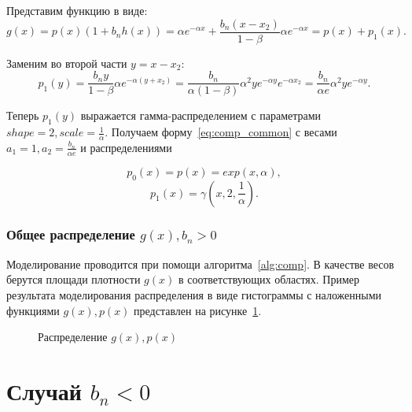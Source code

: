 \documentclass[12pt, specialist, subf, substylefile = spbu.rtx]{disser}
\begin{document}
Представим функцию в виде:
$$
g(x)=p(x)(1+b_nh(x))=\alpha e^{-\alpha x} + \frac{b_n(x-x_2)}{1-\beta}\alpha e^{-\alpha x}=p(x)+p_1(x).
$$

Заменим во второй части $y=x-x_2$:
$$
p_1(y)=\frac{b_ny}{1-\beta} \alpha e^{-\alpha (y+x_2)}=
\frac{b_n}{\alpha(1-\beta)} \alpha^2 ye^{-\alpha y}e^{-\alpha x_2}=
\frac{b_n}{\alpha e} \alpha^2 ye^{-\alpha y}.
$$

Теперь $p_1(y)$ выражается гамма-распределением с параметрами $shape=2, scale=\frac{1}{\alpha}$. Получаем форму~\eqref{eq:comp_common} с весами $a_1=1, a_2=\frac{b_n}{\alpha e}$ и распределениями 

$$
p_0(x)=p(x)=exp(x, \alpha),
$$ 
$$
p_1(x)=\gamma(x, 2, \frac{1}{\alpha}).
$$


\subsubsection{Общее распределение $g(x), b_n > 0$}

Моделирование проводится при помощи алгоритма~\ref{alg:comp}. В качестве весов берутся площади плотности $g(x)$ в соответствующих областях. Пример результата моделирования распределения в виде гистограммы с наложенными функциями $g(x), p(x)$ представлен на рисунке~\ref{ris:hist1}. 

\begin{figure}[h]
\caption{Распределение $g(x), p(x)$}
\label{ris:hist1}
\end{figure}


\section{Случай $b_n < 0$}
\end{document}
